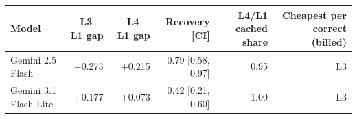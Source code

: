 \begin{tabular}{lrrrrr}
\toprule
\textbf{Model} & \textbf{L3 $-$ L1 gap} & \textbf{L4 $-$ L1 gap} & \textbf{Recovery} [CI] & \textbf{L4/L1 cached share} & \textbf{Cheapest per correct (billed)} \\
\midrule
Gemini 2.5 Flash & +0.273 & +0.215 & 0.79 [0.58, 0.97] & 0.95 & L3 \\
Gemini 3.1 Flash-Lite & +0.177 & +0.073 & 0.42 [0.21, 0.60] & 1.00 & L3 \\
\bottomrule
\end{tabular}
